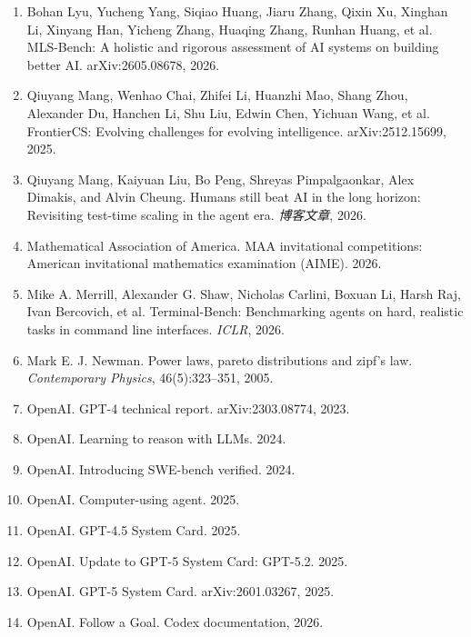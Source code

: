 \begin{enumerate}
\item Bohan Lyu, Yucheng Yang, Siqiao Huang, Jiaru Zhang, Qixin Xu, Xinghan Li, Xinyang Han, Yicheng Zhang, Huaqing Zhang, Runhan Huang, et al. MLS-Bench: A holistic and rigorous assessment of AI systems on building better AI. arXiv:2605.08678, 2026.

\item Qiuyang Mang, Wenhao Chai, Zhifei Li, Huanzhi Mao, Shang Zhou, Alexander Du, Hanchen Li, Shu Liu, Edwin Chen, Yichuan Wang, et al. FrontierCS: Evolving challenges for evolving intelligence. arXiv:2512.15699, 2025.

\item Qiuyang Mang, Kaiyuan Liu, Bo Peng, Shreyas Pimpalgaonkar, Alex Dimakis, and Alvin Cheung. Humans still beat AI in the long horizon: Revisiting test-time scaling in the agent era. \textit{博客文章}, 2026.

\item Mathematical Association of America. MAA invitational competitions: American invitational mathematics examination (AIME). 2026.

\item Mike A. Merrill, Alexander G. Shaw, Nicholas Carlini, Boxuan Li, Harsh Raj, Ivan Bercovich, et al. Terminal-Bench: Benchmarking agents on hard, realistic tasks in command line interfaces. \textit{ICLR}, 2026.

\item Mark E. J. Newman. Power laws, pareto distributions and zipf's law. \textit{Contemporary Physics}, 46(5):323--351, 2005.

\item OpenAI. GPT-4 technical report. arXiv:2303.08774, 2023.

\item OpenAI. Learning to reason with LLMs. 2024.

\item OpenAI. Introducing SWE-bench verified. 2024.

\item OpenAI. Computer-using agent. 2025.

\item OpenAI. GPT-4.5 System Card. 2025.

\item OpenAI. Update to GPT-5 System Card: GPT-5.2. 2025.

\item OpenAI. GPT-5 System Card. arXiv:2601.03267, 2025.

\item OpenAI. Follow a Goal. Codex documentation, 2026.


\end{enumerate}
